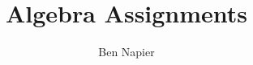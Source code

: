 \documentclass[a4paper, answers]{exam}
\title{Algebra Assignments}
\author{Ben Napier}
\begin{document}
    \maketitle
    \begin{questions}
%       
%       
%       
        
    \end{questions}
\end{document}
